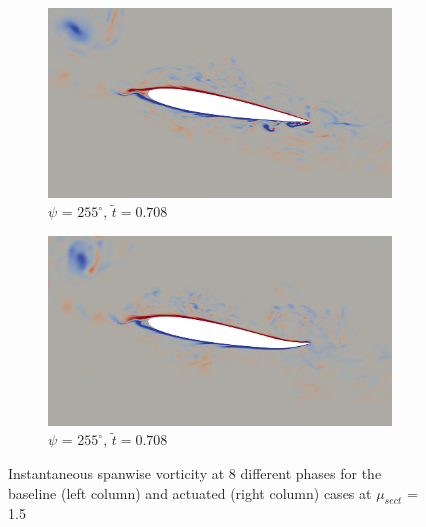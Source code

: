 \begin{figure}[H]
	\begin{subfigure}[b]{0.4\textwidth}
		\centering
		\includegraphics[width=1\textwidth]{figures/zonal_adapt_results/AC/mu_1pt5/baseline/phase_255.png}
		\caption{ $\psi$ = $255^\circ$, $\tilde{t}=0.708$}
		\label{fig:mu_1pt5_baseline_psi255}
	\end{subfigure}
	\begin{subfigure}[b]{0.4\textwidth}
		\centering
		\includegraphics[width=1\textwidth]{figures/zonal_adapt_results/AC/mu_1pt5/AC/phase_255.png}
		\caption{ $\psi$ = $255^\circ$, $\tilde{t}=0.708$}
		\label{fig:mu_1pt5_AC_psi255}
	\end{subfigure}
	
	
	\caption{Instantaneous spanwise vorticity at 8 different phases for the baseline (left column) and actuated (right column) cases at $\mu_{sect}$ = 1.5}
\end{figure}

